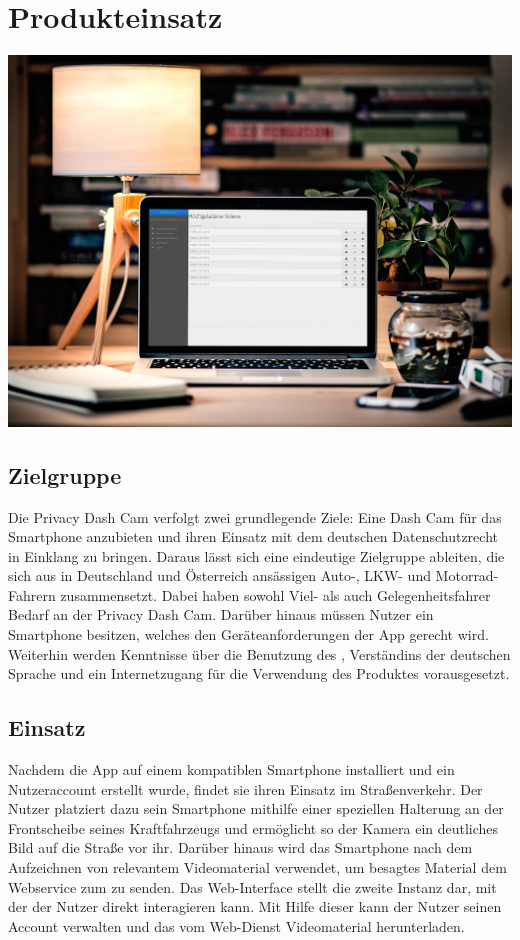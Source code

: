 \chapter{Produkteinsatz}

\includegraphics[width=\textwidth]{subtopicsFuncspec/Res/Mockups/Webinterface_desktop.jpg}

\section{Zielgruppe}
Die Privacy Dash Cam verfolgt zwei grundlegende Ziele: Eine Dash Cam für das \gls{Smartphone} anzubieten und ihren Einsatz mit dem deutschen Datenschutzrecht in Einklang zu bringen. Daraus lässt sich eine eindeutige Zielgruppe ableiten, die sich aus in Deutschland und Österreich ansässigen Auto-, LKW- und Motorrad-Fahrern zusammensetzt. Dabei haben sowohl Viel- als auch Gelegenheitsfahrer Bedarf an der Privacy Dash Cam. Darüber hinaus müssen Nutzer ein \gls{Smartphone} besitzen, welches den Geräteanforderungen der \gls{App} gerecht wird. Weiterhin werden Kenntnisse über die Benutzung des , Verständins der deutschen Sprache und ein Internetzugang für die Verwendung des Produktes vorausgesetzt.

\section{Einsatz}
Nachdem die \gls{App} auf einem kompatiblen \gls{Smartphone} installiert und ein Nutzeraccount erstellt wurde, findet sie ihren Einsatz im Straßenverkehr. Der Nutzer platziert dazu sein \gls{Smartphone} mithilfe einer speziellen Halterung an der Frontscheibe seines Kraftfahrzeugs und ermöglicht so der Kamera ein deutliches Bild auf die Straße vor ihr. Darüber hinaus wird das \gls{Smartphone} nach dem Aufzeichnen von relevantem Videomaterial verwendet, um besagtes Material dem Webservice zum  zu senden.\newline
Das Web-Interface stellt die zweite Instanz dar, mit der der Nutzer direkt interagieren kann. Mit Hilfe dieser kann der Nutzer seinen Account verwalten und das vom \gls{Web-Dienst}  Videomaterial herunterladen.

